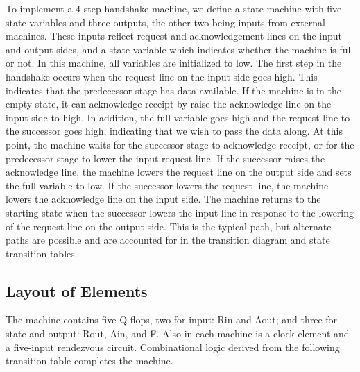 \documentclass[10pt]{article}
\begin{document}
To implement a 4-step handshake machine, we define a state machine with five state variables and three outputs, the other two being inputs from external machines. These inputs reflect request and acknowledgement lines on the input and output sides, and a state variable which indicates whether the machine is full or not. In this machine, all variables are initialized to low. The first step in the handshake occurs when the request line on the input side goes high. This indicates that the predecessor stage has data available. If the machine is in the empty state, it can acknowledge receipt by raise the acknowledge line on the input side to high. In addition, the full variable goes high and the request line to the successor goes high, indicating that we wish to pass the data along. At this point, the machine waits for the successor stage to acknowledge receipt, or for the predecessor stage to lower the input request line. If the successor raises the acknowledge line, the machine lowers the request line on the output side and sets the full variable to low. If the successor lowers the request line, the machine lowers the acknowledge line on the input side. The machine returns to the starting state when the successor lowers the input line in response to the lowering of the request line on the output side. This is the typical path, but alternate paths are possible and are accounted for in the transition diagram and state transition tables.

\subsection{Layout of Elements}

The machine contains five Q-flops, two for input: Rin and Aout; and three for state and output: Rout, Ain, and F. Also in each machine is a clock element and a five-input rendezvous circuit. Combinational logic derived from the following transition table completes the machine.
\end{document}
